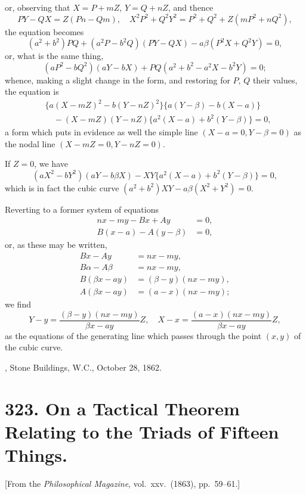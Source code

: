 \documentclass[11pt,a4paper]{article}
\theoremstyle{plain}
\begin{document}
\newpage
or, observing that $X = P + mZ$, $Y = Q + nZ$, and thence
\[
PY - QX = Z(Pn - Qm), \quad X^2P^2 + Q^2Y^2 = P^2 + Q^2 + Z(mP^2 + nQ^2),
\]
the equation becomes
\[
(a^2 + b^2)PQ + (a^2P - b^2Q)(PY - QX) - a\beta(P^2X + Q^2Y) = 0,
\]
or, what is the same thing,
\[
(aP^2 - bQ^2)(aY - bX) + PQ(a^2 + b^2 - a^2X - b^2Y) = 0;
\]
whence, making a slight change in the form, and restoring for $P$, $Q$ their values, the equation is
\begin{align*}
&\{a(X - mZ)^2 - b(Y - nZ)^2\}\{a(Y - \beta) - b(X - a)\} \\
&\quad - (X - mZ)(Y - nZ)\{a^2(X - a) + b^2(Y - \beta)\} = 0,
\end{align*}
a form which puts in evidence as well the simple line $(X - a = 0, Y - \beta = 0)$ as the nodal line $(X - mZ = 0, Y - nZ = 0)$.

If $Z = 0$, we have
\[
(aX^2 - bY^2)(aY - b\beta X) - XY\{a^2(X - a) + b^2(Y - \beta)\} = 0,
\]
which is in fact the cubic curve $(a^2 + b^2)XY - a\beta(X^2 + Y^2) = 0$.

Reverting to a former system of equations
\begin{align*}
nx - my - Bx + Ay &= 0, \\
B(x - a) - A(y - \beta) &= 0,
\end{align*}
or, as these may be written,
\begin{align*}
Bx - Ay &= nx - my, \\
B\alpha - A\beta &= nx - my, \\
B(\beta x - ay) &= (\beta - y)(nx - my), \\
A(\beta x - ay) &= (a - x)(nx - my);
\end{align*}
we find
\[
Y - y = \frac{(\beta - y)(nx - my)}{\beta x - ay} Z, \quad X - x = \frac{(a - x)(nx - my)}{\beta x - ay} Z,
\]
as the equations of the generating line which passes through the point $(x, y)$ of the cubic curve.

\medskip
{}, Stone Buildings, W.C., October 28, 1862.


\newpage
\section*{323. On a Tactical Theorem Relating to the Triads of Fifteen Things.}

[From the \textit{Philosophical Magazine}, vol.\ xxv.\ (1863), pp.\ 59--61.]
\end{document}
